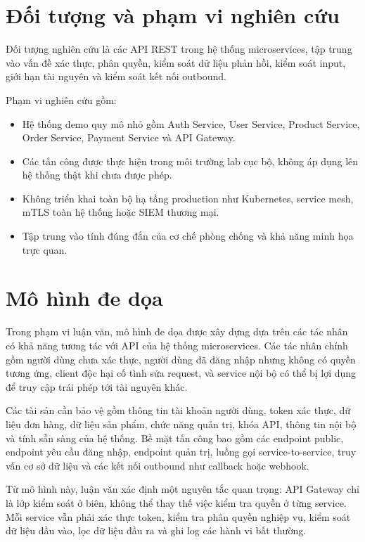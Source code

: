 \documentclass[14pt,a4paper]{extreport}
\begin{document}
\section{Đối tượng và phạm vi nghiên cứu}
Đối tượng nghiên cứu là các API REST trong hệ thống microservices, tập trung vào vấn đề xác thực, phân quyền, kiểm soát dữ liệu phản hồi, kiểm soát input, giới hạn tài nguyên và kiểm soát kết nối outbound.

Phạm vi nghiên cứu gồm:
\begin{itemize}
  \item Hệ thống demo quy mô nhỏ gồm Auth Service, User Service, Product Service, Order Service, Payment Service và API Gateway.
  \item Các tấn công được thực hiện trong môi trường lab cục bộ, không áp dụng lên hệ thống thật khi chưa được phép.
  \item Không triển khai toàn bộ hạ tầng production như Kubernetes, service mesh, mTLS toàn hệ thống hoặc SIEM thương mại.
  \item Tập trung vào tính đúng đắn của cơ chế phòng chống và khả năng minh họa trực quan.
\end{itemize}

\section{Mô hình đe dọa}
Trong phạm vi luận văn, mô hình đe dọa được xây dựng dựa trên các tác nhân có khả năng tương tác với API của hệ thống microservices. Các tác nhân chính gồm người dùng chưa xác thực, người dùng đã đăng nhập nhưng không có quyền tương ứng, client độc hại cố tình sửa request, và service nội bộ có thể bị lợi dụng để truy cập trái phép tới tài nguyên khác.

Các tài sản cần bảo vệ gồm thông tin tài khoản người dùng, token xác thực, dữ liệu đơn hàng, dữ liệu sản phẩm, chức năng quản trị, khóa API, thông tin nội bộ và tính sẵn sàng của hệ thống. Bề mặt tấn công bao gồm các endpoint public, endpoint yêu cầu đăng nhập, endpoint quản trị, luồng gọi service-to-service, truy vấn cơ sở dữ liệu và các kết nối outbound như callback hoặc webhook.

Từ mô hình này, luận văn xác định một nguyên tắc quan trọng: API Gateway chỉ là lớp kiểm soát ở biên, không thể thay thế việc kiểm tra quyền ở từng service. Mỗi service vẫn phải xác thực token, kiểm tra phân quyền nghiệp vụ, kiểm soát dữ liệu đầu vào, lọc dữ liệu đầu ra và ghi log các hành vi bất thường.
\end{document}
